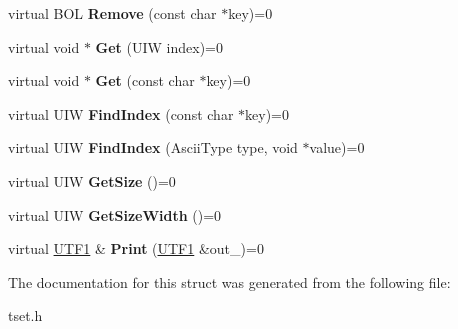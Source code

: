 \begin{DoxyCompactItemize}
virtual B\+OL {\bfseries Remove} (const char $\ast$key)=0
\item 
\mbox{\label{struct___1_1_collection_aed4556e61d25cf78ed8b8ffff5544a25}} 
virtual void $\ast$ {\bfseries Get} (U\+IW index)=0
\item 
\mbox{\label{struct___1_1_collection_a312bda685ccc810998d7f74c52a0780b}} 
virtual void $\ast$ {\bfseries Get} (const char $\ast$key)=0
\item 
\mbox{\label{struct___1_1_collection_a9fc9a0581e1194f380e88f6fd5dffe58}} 
virtual U\+IW {\bfseries Find\+Index} (const char $\ast$key)=0
\item 
\mbox{\label{struct___1_1_collection_afd0337f030477dcd2096406c1726d016}} 
virtual U\+IW {\bfseries Find\+Index} (Ascii\+Type type, void $\ast$value)=0
\item 
\mbox{\label{struct___1_1_collection_a4f65730da45fdfa070e0104430496390}} 
virtual U\+IW {\bfseries Get\+Size} ()=0
\item 
\mbox{\label{struct___1_1_collection_a698ca48dbc2870f1f2bed1344441b826}} 
virtual U\+IW {\bfseries Get\+Size\+Width} ()=0
\item 
\mbox{\label{struct___1_1_collection_a422d6d496174cc9fd2f6d03956ef5a03}} 
virtual \mbox{\hyperlink{struct___1_1_u_t_f1}{U\+T\+F1}} \& {\bfseries Print} (\mbox{\hyperlink{struct___1_1_u_t_f1}{U\+T\+F1}} \&out\+\_\+)=0
\end{DoxyCompactItemize}


The documentation for this struct was generated from the following file\+:\begin{DoxyCompactItemize}
\item 
tset.\+h\end{DoxyCompactItemize}
